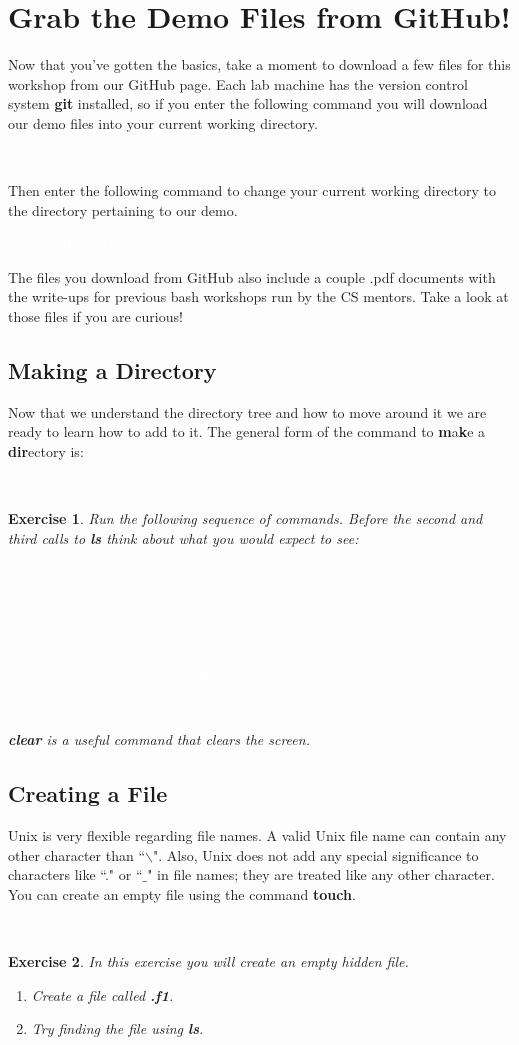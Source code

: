 \documentclass[oneside]{book}
\newcommand{\commandline}[1]{\begin{center} \colorbox{Dark}{\textcolor{white}{#1}} \end{center}}
\newtheorem{ex}{Exercise}[chapter]
\begin{document}
\section{Grab the Demo Files from GitHub!}
Now that you've gotten the basics, take a moment to download a few files for this workshop from our GitHub page. Each lab machine has the version control system \textbf{git} installed, so if you enter the following command you will download our demo files into your current working directory.

\commandline{git clone https://github.com/wwu-mentors/bash.git}
Then enter the following command to change your current working directory to the directory pertaining to our demo.
\commandline{cd bash/Bash\_Combined/demo}
The files you download from GitHub also include a couple .pdf documents with the write-ups for previous bash workshops run by the CS mentors. Take a look at those files if you are curious!

\subsection{Making a Directory}
Now that we understand the directory tree and how to move around it we are ready to learn how to add to it. The general form of the command to \textbf{m}a\textbf{k}e a \textbf{dir}ectory is:
\commandline{mkdir newdirname1 newdirname2 ...}
\begin{ex}
	Run the following sequence of commands. Before the second and third calls to \textbf{ls} think about what you would expect to see:
\commandline{ls}
\commandline{mkdir FirstDir SecondDir}
\commandline{ls}
\commandline{mkdir FirstDir/Foo FirstDir/Foo2}
\commandline{ls FirstDir}
\textbf{clear} is a useful command that clears the screen.
\end{ex}

\subsection{Creating a File}

Unix is very flexible regarding file names. A valid Unix file name can contain any other character than ``$\backslash$". Also, Unix does not add any special significance to characters like ``." or ``$\_$" in file names; they are treated like any other character. You can create an empty file using the command \textbf{touch}.
\commandline{touch file_name}

\begin{ex} In this exercise you will create an empty hidden file.
    \begin{enumerate}
        \item Create a file called \textbf{.f1}.
        \item Try finding the file using \textbf{ls}.
    \end{enumerate}        
\end{ex}
\end{document}
